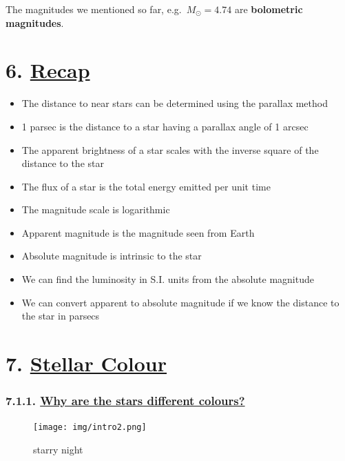 \documentclass[
  letterpaper,
  DIV=11,
  numbers=noendperiod]{scrartcl}
\begin{document}
The magnitudes we mentioned so far, e.g.~\(M_\odot = 4.74\) are
\textbf{bolometric magnitudes}.

\hypertarget{recap}{%
\section{\texorpdfstring{6.
\protect\hyperlink{toc0_}{Recap}}{6. Recap}}\label{recap}}

\begin{itemize}
\item
  The distance to near stars can be determined using the parallax method
\item
  1 parsec is the distance to a star having a parallax angle of 1 arcsec
\item
  The apparent brightness of a star scales with the inverse square of
  the distance to the star
\item
  The flux of a star is the total energy emitted per unit time
\item
  The magnitude scale is logarithmic
\item
  Apparent magnitude is the magnitude seen from Earth
\item
  Absolute magnitude is intrinsic to the star
\item
  We can find the luminosity in S.I. units from the absolute magnitude
\item
  We can convert apparent to absolute magnitude if we know the distance
  to the star in parsecs
\end{itemize}

\hypertarget{stellar-colour}{%
\section{\texorpdfstring{7. \protect\hyperlink{toc0_}{Stellar
Colour}}{7. Stellar Colour}}\label{stellar-colour}}

\hypertarget{why-are-the-stars-different-colours}{%
\subsubsection{\texorpdfstring{7.1.1. \protect\hyperlink{toc0_}{Why are
the stars different
colours?}}{7.1.1. Why are the stars different colours?}}\label{why-are-the-stars-different-colours}}

\begin{figure}

{\centering \texttt{[image: img/intro2.png]}

}

\caption{starry night}

\end{figure}
\end{document}
